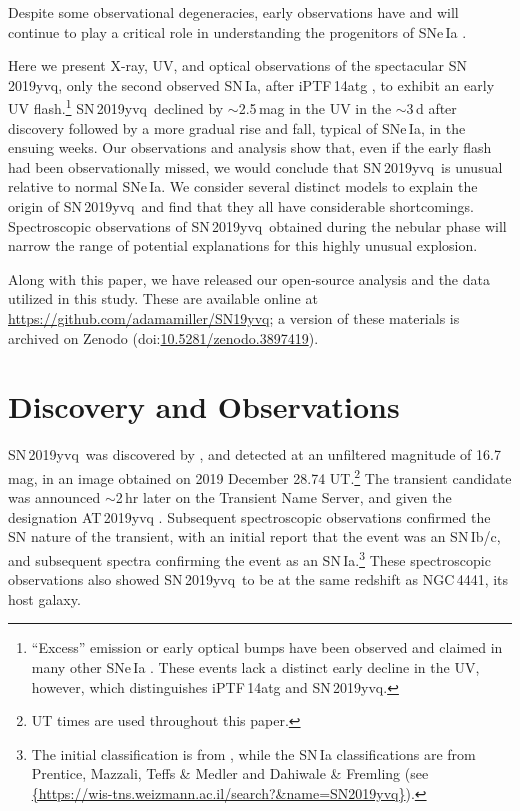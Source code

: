 \documentclass[twocolumn]{aastex63}
\newcommand{\sn}{SN\,2019yvq}
\begin{document}
Despite some observational degeneracies, early observations have and will
continue to play a critical role in understanding the progenitors of SNe\,Ia
\citep[e.g., early photometry of SN\,2011fe constrained the size of the
exploding star to be $\lesssim 0.02$\,$R_\odot$, providing the most direct
evidence to date that SNe\,Ia come from WDs;][]{Bloom12a}.

Here we present X-ray, UV, and optical observations of the spectacular \sn,
only the second observed SN\,Ia, after iPTF\,14atg \citep{Cao15}, to exhibit
an early UV flash.\footnote{``Excess'' emission or early optical bumps have
been observed and claimed in many other SNe\,Ia
\citep[e.g.,][]{Goobar15,Marion16,Hosseinzadeh17,Jiang17,Dimitriadis19,
Shappee19}. These events lack a distinct early decline in the UV, however,
which distinguishes iPTF\,14atg and \sn.} \sn\ declined by $\sim$2.5\,mag in
the UV in the $\sim$3\,d after discovery followed by a more gradual rise and
fall, typical of SNe\,Ia, in the ensuing weeks. Our observations and analysis
show that, even if the early flash had been observationally missed, we would
conclude that \sn\ is unusual relative to normal SNe\,Ia. We consider several
distinct models to explain the origin of \sn\ and find that they all have
considerable shortcomings. Spectroscopic observations of \sn\ obtained during
the nebular phase will narrow the range of potential explanations for this
highly unusual explosion.

Along with this paper, we have released our open-source analysis and the data
utilized in this study. These are available online at
\href{https://github.com/adamamiller/SN19yvq}
{\url{https://github.com/adamamiller/SN19yvq}}; a version of these materials
is archived on Zenodo
(doi:\href{https://doi.org/10.5281/zenodo.3897419}{10.5281/zenodo.3897419}).

\section{Discovery and Observations}\label{sec:obs}

\sn\ was discovered by \citet{Itagaki19}, and detected at an unfiltered
magnitude of 16.7\,mag, in an image obtained on 2019 December 28.74
UT.\footnote{UT times are used throughout this paper.} The transient candidate
was announced $\sim$2\,hr later on the Transient Name Server, and given the
designation AT\,2019yvq \citep{Itagaki19}. Subsequent spectroscopic
observations confirmed the SN nature of the transient, with an initial report
that the event was an SN\,Ib/c, and subsequent spectra confirming the event as
an SN\,Ia.\footnote{The initial classification is from \citet{Kawabata20},
while the SN\,Ia classifications are from Prentice, Mazzali, Teffs \& Medler
and Dahiwale \& Fremling (see
\href{https://wis-tns.weizmann.ac.il/search?&name=SN2019yvq}
{\url{{https://wis-tns.weizmann.ac.il/search?&name=SN2019yvq}}}).} These
spectroscopic observations also showed \sn\ to be at the same redshift as
NGC\,4441, its host galaxy.
\end{document}

